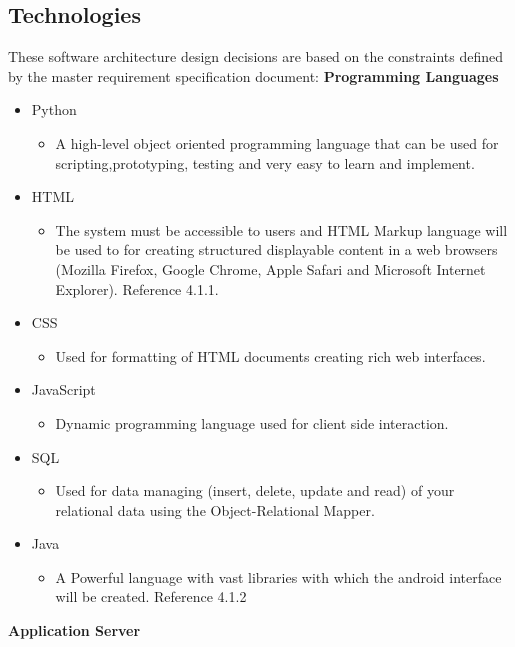 \documentclass[12pt]{article}
\begin{document}
	\subsection{Technologies}
	These software architecture design decisions are based on the constraints defined by the master requirement specification document:
\indent\indent \linebreak\linebreak\textbf{Programming Languages}
\begin{itemize}
\item Python
\begin{itemize}
\item A high-level object oriented programming language that can be used for scripting,prototyping, testing and very easy to learn and implement.
\end{itemize}
\item HTML
\begin{itemize}
\item The system must be accessible to users and HTML Markup language will be used to for 	creating structured displayable content in a web browsers (Mozilla Firefox, Google Chrome, Apple Safari and Microsoft Internet Explorer). Reference 4.1.1.
\end{itemize}
\item CSS
\begin{itemize}
\item Used for formatting of HTML documents creating rich web interfaces.
\end{itemize}
\item JavaScript
\begin{itemize}
\item Dynamic programming language used for client side interaction.
\end{itemize}
\item SQL
\begin{itemize}
\item Used for data managing (insert, delete, update and read) of your relational data using the Object-Relational Mapper.
\end{itemize}
\item Java
\begin{itemize}
\item A Powerful language with vast libraries with which the android interface will be created. Reference 4.1.2
\end{itemize}
\end{itemize}
\indent\indent \linebreak\linebreak\textbf{Application Server}
\end{document}
